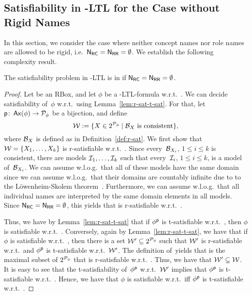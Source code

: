 \subsection{Satisfiability in \texorpdfstring{\SHOQ-LTL}{SHOQ-LTL} for the Case without Rigid Names}\label{sec:sat-no-rigid}

In this section, we consider the case where neither concept names nor role names
are allowed to be rigid, i.e.~$\mathsf{N_{RC}}=\mathsf{N_{RR}}=\emptyset$.
%
We establish the following complexity result.

\begin{theorem}\label{thm:upper-bound-shoq-ltl-no-rigid}
    The satisfiability problem in \SHOQ-LTL is in \ExpTime if
    $\mathsf{N_{RC}}=\mathsf{N_{RR}}=\emptyset$.
\end{theorem}

\begin{proof}
    Let \Rmc be an RBox, and let $\phi$ be a \SHOQ-LTL-formula w.r.t.~\Rmc.  We
    can decide satisfiability of~$\phi$ w.r.t.~\Rmc using
    Lemma~\ref{lem:r-sat-t-sat}.
    For that, let $\mathsf{p}\colon\operatorname{\mathsf{Ax}}(\phi)\to\mathcal{P}_\phi$ be a bijection, and define
    \[\mathcal{W}:=\{X\in 2^{\mathcal{P}_\phi}\mid\mathcal{B}_X\ \text{is consistent}\},\]
    where $\mathcal{B}_X$ is defined as in Definition~\ref{def:r-sat}.  We first show
    that $\mathcal{W}=\{X_1,\dots,X_k\}$ is r-satisfiable w.r.t.~\Rmc.
    Since every~$\mathcal{B}_{X_i}$, $1\le i\le k$ is consistent, there are models
    $\mathcal{I}_1,\dots,\mathcal{I}_k$ such that every~$\mathcal{I}_i$, $1\le i\le k$, is a model
    of~$\mathcal{B}_{X_i}$.  We can assume w.l.o.g.\ that all of these models have the
    same domain since we can assume w.l.o.g.\ that their domains are countably
    infinite due to to the Löwenheim-Skolem theorem~\cite{Loe-MA15,Sko-VS20}.
    Furthermore, we can assume w.l.o.g.\ that all individual names are
    interpreted by the same domain elements in all models.  Since
    $\mathsf{N_{RC}}=\mathsf{N_{RR}}=\emptyset$, this yields that \Wmc is r-satisfiable w.r.t.~\Rmc.

    Thus, we have by Lemma~\ref{lem:r-sat-t-sat} that if $\phi^\mathsf{p}$ is
    t-satisfiable w.r.t.~\Wmc, then $\phi$ is satisfiable w.r.t.~\Rmc.
    Conversely, again by Lemma~\ref{lem:r-sat-t-sat}, we have that if $\phi$ is
    satisfiable w.r.t.~\Rmc, then there is a set $\mathcal{W}'\subseteq 2^{\mathcal{P}_\phi}$
    such that $\mathcal{W}'$ is r-satisfiable w.r.t.~\Rmc and $\phi^\mathsf{p}$ is
    t-satisfiable w.r.t.~$\mathcal{W}'$.  The definition of~\Wmc yields that \Wmc is
    the maximal subset of $2^{\mathcal{P}_\phi}$ that is r-satisfiable w.r.t.~\Rmc.
    Thus, we have that $\mathcal{W}'\subseteq\mathcal{W}$.  It is easy to see that the
    t-satisfiability of~$\phi^\mathsf{p}$ w.r.t.~$\mathcal{W}'$ implies that $\phi^\mathsf{p}$ is
    t-satisfiable w.r.t.~\Wmc.
    Hence, we have that $\phi$ is satisfiable w.r.t.~\Rmc iff $\phi^\mathsf{p}$ is
    t-satisfiable w.r.t.~\Wmc.


\end{proof}
